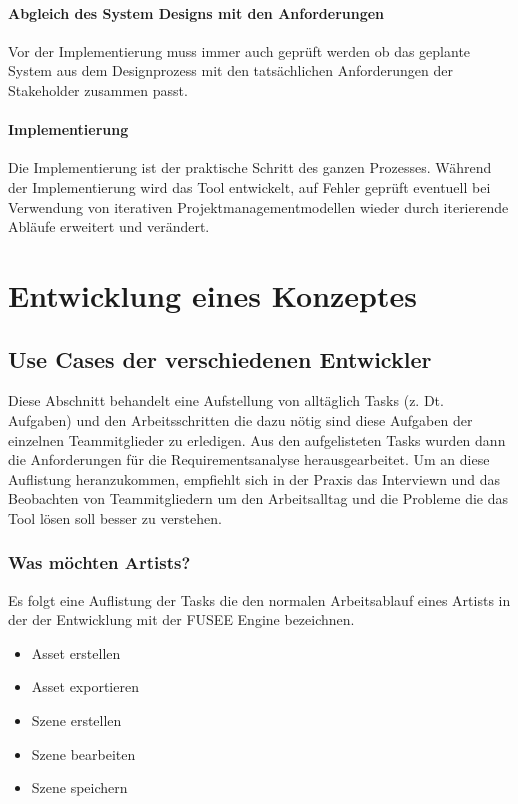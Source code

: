\documentclass[pagesize, paper=a4, fontsize=12pt,titlepage=true, headings=small, headnosepline, abstractoff, liststotoc, nochapterprefix, plainheadsepline, twoside]{scrreprt}
\begin{document}
\subsubsection{Abgleich des System Designs mit den Anforderungen}
Vor der Implementierung muss immer auch geprüft werden ob das geplante System aus dem Designprozess mit den tatsächlichen Anforderungen der Stakeholder zusammen passt.

\subsubsection{Implementierung}
Die Implementierung ist der praktische Schritt des ganzen Prozesses. Während der Implementierung wird das Tool entwickelt, auf Fehler geprüft eventuell bei Verwendung von iterativen Projektmanagementmodellen wieder durch iterierende Abläufe erweitert und verändert.


\chapter{Entwicklung eines Konzeptes}

\section{Use Cases der verschiedenen Entwickler}
Diese Abschnitt behandelt eine Aufstellung von alltäglich Tasks (z. Dt. Aufgaben) und den Arbeitsschritten die dazu nötig sind diese Aufgaben der einzelnen Teammitglieder zu erledigen. Aus den aufgelisteten Tasks wurden dann die Anforderungen für die Requirementsanalyse herausgearbeitet. Um an diese Auflistung heranzukommen, empfiehlt sich in der Praxis das Interviewn und das Beobachten von Teammitgliedern um den Arbeitsalltag und die Probleme die das Tool lösen soll besser zu verstehen.

\subsection{Was möchten Artists?}
Es folgt eine Auflistung der Tasks die den normalen Arbeitsablauf eines Artists in der der Entwicklung mit der FUSEE Engine bezeichnen.
\begin{itemize}
\item Asset erstellen
\item Asset exportieren
\item Szene erstellen
\item Szene bearbeiten
\item Szene speichern
\end{itemize}
\end{document}
